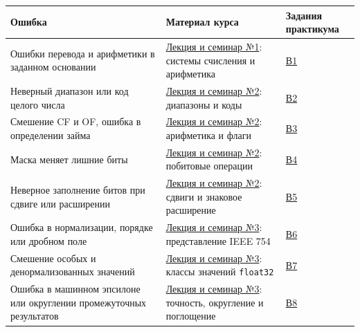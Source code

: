 \begin{center}
\small
\begin{tabular}{>{\raggedright\arraybackslash}p{}|>{\raggedright\arraybackslash}p{}|>{\raggedright\arraybackslash}p{}}
Ошибка & Материал курса & Задания практикума\\\hline
Ошибки перевода и арифметики в заданном основании & \href{adaptation_course.pdf}{Лекция и семинар №1}: системы счисления и арифметика & \hyperref[task:v1]{В1}\\[4pt]
Неверный диапазон или код целого числа & \href{adaptation_course.pdf}{Лекция и семинар №2}: диапазоны и коды & \hyperref[task:v2]{В2}\\[4pt]
Смешение CF и OF, ошибка в определении займа & \href{adaptation_course.pdf}{Лекция и семинар №2}: арифметика и флаги & \hyperref[task:v3]{В3}\\[4pt]
Маска меняет лишние биты & \href{adaptation_course.pdf}{Лекция и семинар №2}: побитовые операции & \hyperref[task:v4]{В4}\\[4pt]
Неверное заполнение битов при сдвиге или расширении & \href{adaptation_course.pdf}{Лекция и семинар №2}: сдвиги и знаковое расширение & \hyperref[task:v5]{В5}\\[4pt]
Ошибка в нормализации, порядке или дробном поле & \href{adaptation_course.pdf}{Лекция и семинар №3}: представление IEEE 754 & \hyperref[task:v6]{В6}\\[4pt]
Смешение особых и денормализованных значений & \href{adaptation_course.pdf}{Лекция и семинар №3}: классы значений \texttt{float32} & \hyperref[task:v7]{В7}\\[4pt]
Ошибка в машинном эпсилоне или округлении промежуточных результатов & \href{adaptation_course.pdf}{Лекция и семинар №3}: точность, округление и поглощение & \hyperref[task:v8]{В8}
\end{tabular}
\end{center}
